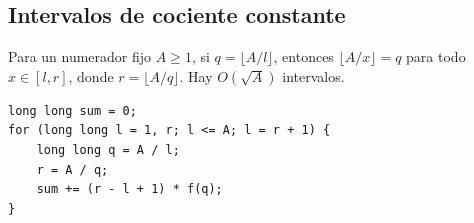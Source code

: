 \subsection{Intervalos de cociente constante}
Para un numerador fijo $A\ge1$, si $q=\lfloor A/l\rfloor$,
entonces $\lfloor A/x\rfloor=q$ para todo
$x\in[l,r]$, donde $r=\lfloor A/q\rfloor$.
Hay $O(\sqrt A)$ intervalos.

\begin{verbatim}
long long sum = 0;
for (long long l = 1, r; l <= A; l = r + 1) {
    long long q = A / l;
    r = A / q;
    sum += (r - l + 1) * f(q);
}
\end{verbatim}